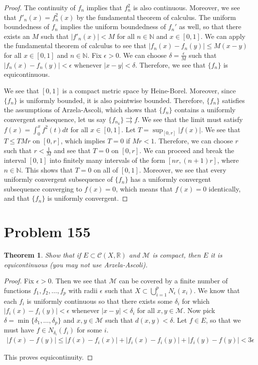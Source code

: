 \documentclass[psamsfonts]{amsart}
\newtheorem{thm}{Theorem}[section]
\theoremstyle{definition}
\theoremstyle{remark}
\numberwithin{equation}{section}
\begin{document}
\begin{proof}
The continuity of $f_n$ implies that $f_n^2$ is also continuous. Moreover, we see that $f'_n(x) = f_n^2(x)$ by the fundamental theorem of calculus. The uniform boundedness of $f_n$ implies the uniform boundedness of $f_n'$ as well, so that there exists an $M$ such that $|f'_n(x)| < M$ for all $n \in \mathbb{N}$ and $x \in [0,1]$. We can apply the fundamental theorem of calculus to see that $|f_n(x) - f_n(y)| \leq M (x-y)$ for all $x \in [0,1]$ and $n \in \mathbb{N}$. Fix $\epsilon > 0$. We can choose $\delta = \frac{\epsilon}{M}$ such that $|f_n(x) - f_n(y) | < \epsilon$ whenever $|x-y| < \delta$. Therefore, we see that $\{ f_n \}$ is equicontinuous. 

We see that $[0,1]$ is a compact metric space by Heine-Borel. Moreover, since $\{ f_n \}$ is uniformly bounded, it is also pointwise bounded. Therefore, $\{f_n \}$ satisfies the assumptions of Arzela-Ascoli, which shows that $\{ f_n \}$ contains a uniformly convergent subsequence, let us say $\{ f_{n_k} \} \rightrightarrows f$. We see that the limit must satisfy $f(x) = \int_0^x f^2(t) dt$ for all $x \in [0,1]$. Let $T = \sup_{[0,r]} |f(x)|$. We see that $T \leq T M r$ on $[0,r]$, which implies $T = 0$ if $M r < 1$. Therefore, we can choose $r$ such that $r < \frac{1}{M}$ and see that $T = 0$ on $[0,r]$. We can proceed and break the interval $[0,1]$ into finitely many intervals of the form $[nr,(n+1)r]$, where $n \in \mathbb{N}$. This shows that $T = 0$ on all of $[0,1]$. Moreover, we see that every uniformly convergent subsequence of $\{ f_n \}$ has a uniformly convergent subsequence converging to $f(x) = 0$, which means that $f(x) = 0$ identically, and that $\{ f_n \}$ is uniformly convergent. 
\end{proof}

\section{Problem 155}

\begin{thm}
Show that if $E \subset \mathscr{C}(X, \mathbb{R})$ and $\mathscr{M}$ is compact, then $E$ it is equicontinuous (you may not use Arzela-Ascoli).
\end{thm}

\begin{proof}
Fix $\epsilon > 0$. Then we see that $\mathscr{M}$ can be covered by a finite number of functions $f_1, f_2, \ldots, f_p$ with radii $\epsilon$ such that $X \subset \bigcup_{i=1}^p N_{\epsilon} (x_i)$. We know that each $f_i$ is uniformly continuous so that there exists some $\delta_i$ for which $|f_i(x) - f_i(y)| < \epsilon$ whenever $|x-y| < \delta_i$ for all $x,y \in \mathscr{M}$. Now pick $\delta = \min \{ \delta_1, \ldots, \delta_p \}$ and $x,y \in \mathscr{M}$ such that $d(x,y) < \delta$. Let $f \in E$, so that we must have $f \in N_{\delta_i} (f_i)$ for some $i$.  
\begin{eqnarray}
|f(x) - f(y)| \leq |f(x) - f_i(x)| + |f_i(x) - f_i(y)| + | f_i(y) - f(y) | < 3 \epsilon
\end{eqnarray}

This proves equicontinuity. 
\end{proof}
\end{document}
